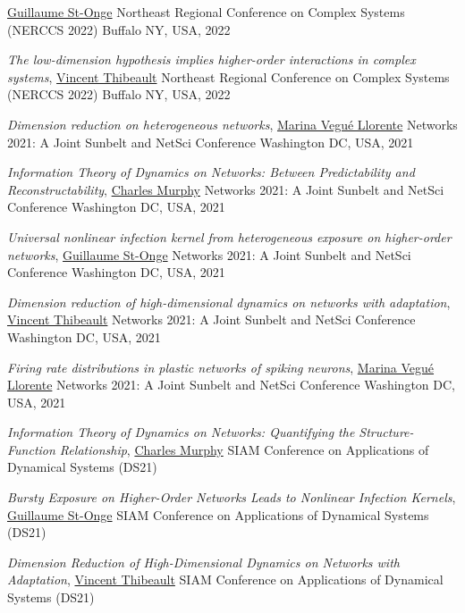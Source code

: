 \documentclass[11pt]{article}
\makeatletter
\newcommand{\reversearabic}[1]{\expandafter\@reversearabic\csname c@#1\endcsname}
\newcommand{\@reversearabic}[1]{%
  \number\numexpr\getrefnumber{this@etaremune@\romannumeral\c@etaremune}-#1+1\relax
}
\newcounter{etaremune}
\newenvironment{etaremune}[1][]{%
  \stepcounter{etaremune}%
  \begin{enumerate}[label=\reversearabic*.,#1]%
}{%
  \edef\@currentlabel{\the\csname c@\@enumctr\endcsname}%
  \label{this@etaremune@\romannumeral\c@etaremune}%
  \end{enumerate}%
}
\makeatother
\begin{document}
\begin{etaremune}[itemsep=0.5em, label={[M\reversearabic*]}, first*=\small\vspace{0.5\baselineskip}]
{  \uline{Guillaume St-Onge}\split
  Northeast Regional Conference on Complex Systems (NERCCS 2022)\split
  Buffalo NY, USA, 2022}
%
  \item \parbox[t]{\textwidth-30pt}{\textit{The low-dimension hypothesis implies higher-order interactions in complex systems},
  \uline{Vincent Thibeault}\split
  Northeast Regional Conference on Complex Systems (NERCCS 2022)\split
  Buffalo NY, USA, 2022}
%
  \item \parbox[t]{\textwidth-30pt}{\textit{Dimension reduction on heterogeneous networks},
  \uline{Marina Vegué Llorente}\split
  Networks 2021: A Joint Sunbelt and NetSci Conference\split
  Washington DC, USA, 2021}
%
  \item \parbox[t]{\textwidth-30pt}{\textit{Information Theory of Dynamics on Networks: Between Predictability and Reconstructability},
  \uline{Charles Murphy}\split
  Networks 2021: A Joint Sunbelt and NetSci Conference\split
  Washington DC, USA, 2021}
%
  \item \parbox[t]{\textwidth-30pt}{\textit{Universal nonlinear infection kernel from heterogeneous exposure on higher-order networks},
  \uline{Guillaume St-Onge}\split
  Networks 2021: A Joint Sunbelt and NetSci Conference\split
  Washington DC, USA, 2021}
%
  \item \parbox[t]{\textwidth-30pt}{\textit{Dimension reduction of high-dimensional dynamics on networks with adaptation},
  \uline{Vincent Thibeault}\split
  Networks 2021: A Joint Sunbelt and NetSci Conference\split
  Washington DC, USA, 2021}
%
  \item \parbox[t]{\textwidth-30pt}{\textit{Firing rate distributions in plastic networks of spiking neurons},
  \uline{Marina Vegué Llorente}\split
  Networks 2021: A Joint Sunbelt and NetSci Conference\split
  Washington DC, USA, 2021}
%
  \item \parbox[t]{\textwidth-30pt}{\textit{Information Theory of Dynamics on Networks: Quantifying the Structure-Function Relationship},
  \uline{Charles Murphy}\split
  SIAM Conference on Applications of Dynamical Systems (DS21)}
%
  \item \parbox[t]{\textwidth-30pt}{\textit{Bursty Exposure on Higher-Order Networks Leads to Nonlinear Infection Kernels},
  \uline{Guillaume St-Onge}\split
  SIAM Conference on Applications of Dynamical Systems (DS21)}
%
  \item \parbox[t]{\textwidth-30pt}{\textit{Dimension Reduction of High-Dimensional Dynamics on Networks with Adaptation},
  \uline{Vincent Thibeault}\split
  SIAM Conference on Applications of Dynamical Systems (DS21)}

\end{etaremune}
\end{document}
